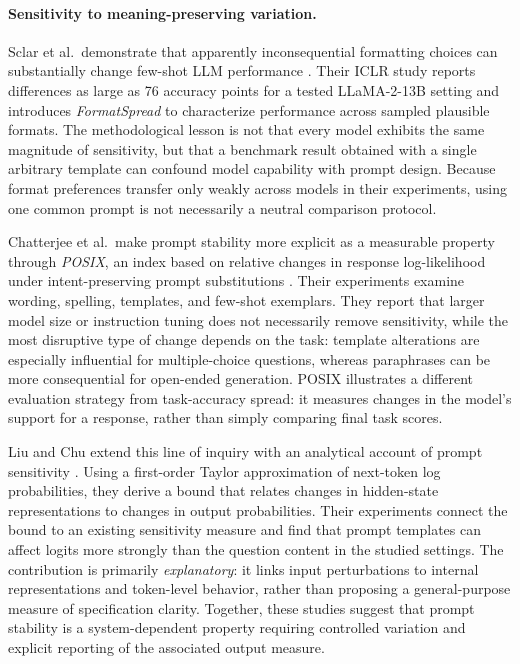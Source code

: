 \paragraph{Sensitivity to meaning-preserving variation.}
Sclar et al.\ demonstrate that apparently inconsequential formatting choices can substantially change few-shot LLM performance \cite{sclar2024formatting}. Their ICLR study reports differences as large as 76 accuracy points for a tested LLaMA-2-13B setting and introduces \emph{FormatSpread} to characterize performance across sampled plausible formats. The methodological lesson is not that every model exhibits the same magnitude of sensitivity, but that a benchmark result obtained with a single arbitrary template can confound model capability with prompt design. Because format preferences transfer only weakly across models in their experiments, using one common prompt is not necessarily a neutral comparison protocol.

Chatterjee et al.\ make prompt stability more explicit as a measurable property through \emph{POSIX}, an index based on relative changes in response log-likelihood under intent-preserving prompt substitutions \cite{chatterjee2024posix}. Their experiments examine wording, spelling, templates, and few-shot exemplars. They report that larger model size or instruction tuning does not necessarily remove sensitivity, while the most disruptive type of change depends on the task: template alterations are especially influential for multiple-choice questions, whereas paraphrases can be more consequential for open-ended generation. POSIX illustrates a different evaluation strategy from task-accuracy spread: it measures changes in the model's support for a response, rather than simply comparing final task scores.

Liu and Chu extend this line of inquiry with an analytical account of prompt sensitivity \cite{liu2026promptsensitivity}. Using a first-order Taylor approximation of next-token log probabilities, they derive a bound that relates changes in hidden-state representations to changes in output probabilities. Their experiments connect the bound to an existing sensitivity measure and find that prompt templates can affect logits more strongly than the question content in the studied settings. The contribution is primarily \emph{explanatory}: it links input perturbations to internal representations and token-level behavior, rather than proposing a general-purpose measure of specification clarity. Together, these studies suggest that prompt stability is a system-dependent property requiring controlled variation and explicit reporting of the associated output measure.

